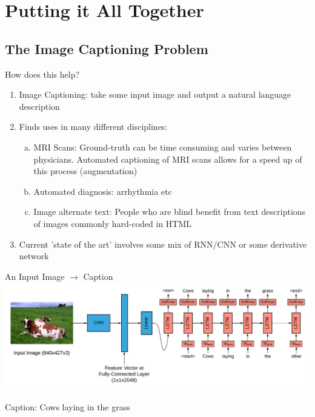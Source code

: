 \documentclass{beamer}
\begin{document}
\section{Putting it All Together}
\subsection{The Image Captioning Problem}
\begin{frame}{How does this help?}
    \begin{enumerate}[1.]
        \item Image Captioning: take some input image and output a natural language description 
        \item Finds uses in many different disciplines:
        \begin{enumerate}[a.]
            \item MRI Scans: Ground-truth can be time consuming and varies between physicians. Automated captioning of MRI scans allows for a speed up of this process (augmentation)
            \item Automated diagnosis: arrhythmia etc
            \item Image alternate text: People who are blind benefit from text descriptions of images commonly hard-coded in HTML 
        \end{enumerate}
        \item Current 'state of the art' involves some mix of RNN/CNN or some derivative network
    \end{enumerate}
\end{frame}
\begin{frame}{An Input Image $\rightarrow$ Caption}
    \includegraphics[width=\textwidth]{nets/conv/CNN-LSTM.png}
    \newline
    \centerline{\Large Caption: Cows laying in the grass}
\end{frame}
\end{document}
